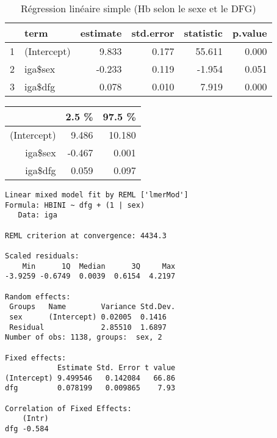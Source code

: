 \documentclass[11pt,a4paper]{article}\usepackage[]{graphicx}\usepackage[]{color}
\makeatletter
\newenvironment{kframe}{%
 \def\at@end@of@kframe{}%
 \ifinner\ifhmode%
  \def\at@end@of@kframe{\end{minipage}}%
  \begin{minipage}{\columnwidth}%
 \fi\fi%
 \def\FrameCommand##1{\hskip\@totalleftmargin \hskip-\fboxsep
 \colorbox{shadecolor}{##1}\hskip-\fboxsep
     \hskip-\linewidth \hskip-\@totalleftmargin \hskip\columnwidth}%
 \MakeFramed {\advance\hsize-\width
   \@totalleftmargin\z@ \linewidth\hsize
   \@setminipage}}%
 {\par\unskip\endMakeFramed%
 \at@end@of@kframe}
\newenvironment{knitrout}{}{} %
\makeatother
\begin{document}
\begin{table}[H]
\centering
\begin{tabular}{rlrrrr}
  \hline
 & term & estimate & std.error & statistic & p.value \\ 
  \hline
1 & (Intercept) & 9.833 & 0.177 & 55.611 & 0.000 \\ 
  2 & iga\$sex & -0.233 & 0.119 & -1.954 & 0.051 \\ 
  3 & iga\$dfg & 0.078 & 0.010 & 7.919 & 0.000 \\ 
   \hline
\end{tabular}
\caption{Régression linéaire simple (Hb selon le sexe et le DFG)} 
\end{table}
\begin{table}[ht]
\centering
\begin{tabular}{rrr}
  \hline
 & 2.5 \% & 97.5 \% \\ 
  \hline
(Intercept) & 9.486 & 10.180 \\ 
  iga\$sex & -0.467 & 0.001 \\ 
  iga\$dfg & 0.059 & 0.097 \\ 
   \hline
\end{tabular}
\end{table}


\begin{knitrout}
\color{fgcolor}\begin{kframe}
\begin{verbatim}
Linear mixed model fit by REML ['lmerMod']
Formula: HBINI ~ dfg + (1 | sex)
   Data: iga

REML criterion at convergence: 4434.3

Scaled residuals: 
    Min      1Q  Median      3Q     Max 
-3.9259 -0.6749  0.0039  0.6154  4.2197 

Random effects:
 Groups   Name        Variance Std.Dev.
 sex      (Intercept) 0.02005  0.1416  
 Residual             2.85510  1.6897  
Number of obs: 1138, groups:  sex, 2

Fixed effects:
            Estimate Std. Error t value
(Intercept) 9.499546   0.142084   66.86
dfg         0.078199   0.009865    7.93

Correlation of Fixed Effects:
    (Intr)
dfg -0.584
\end{verbatim}
\end{kframe}
\end{knitrout}
\end{document}
